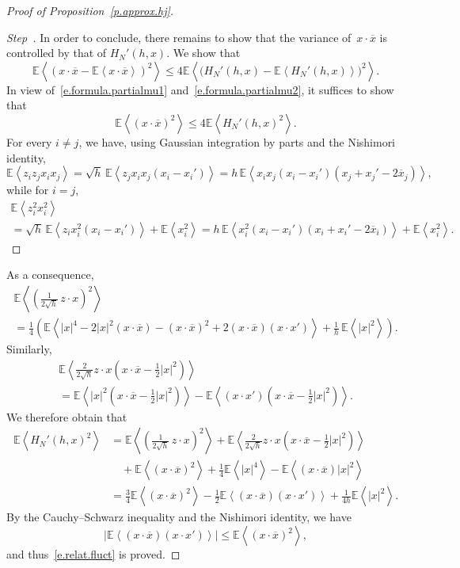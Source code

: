 \documentclass[10pt]{amsart}
\theoremstyle{definition}\newtheorem{defi}[theo]{Definition}\newtheorem{rema}[theo]{Remark}\newtheorem{exam}[theo]{Example}\newtheorem{exem}[theo]{Example}\newtheorem{nota}[theo]{Notation}
\newcommand{\E}{\mathbb{E}}
\newcommand{\1}{\mathds{1}}
\renewcommand{\le}{\leqslant}
\newcommand{\la}{\left\langle}
\newcommand{\ra}{\right\rangle}
\renewcommand{\bar}{\overline}
\newcounter{stepcount}
\newenvironment{step}{\refstepcounter{stepcount}\begin{proof}[Step~\thestepcount]}{\let\qed\relax\end{proof}}
\begin{document}
\begin{proof}[Proof of Proposition~\ref{p.approx.hj}]

\begin{step}\label{st3}
In order to conclude, there remains to show that the variance of~$x \cdot \bar x$ is controlled by that of $H_N'(h,x)$. We show that
\begin{equation}\label{e.relat.fluct}
\E \la \left(x\cdot \bar x - \E\la x\cdot \bar x \ra \right)^2 \ra \le 4 \E \la \big(H_N'(h,x) - \E \la H_N'(h,x) \ra \big) ^2 \ra.
\end{equation}
In view of~\eqref{e.formula.partialmu1} and~\eqref{e.formula.partialmu2}, it suffices to show that
\[
\E \la \left(x\cdot \bar x \right)^2 \ra \le 4 \E \la H_N'(h,x) ^2 \ra.
\]
For every $i \neq j$, we have, using Gaussian integration by parts and the Nishimori identity,
\[
\E \la z_i z_j x_i x_j \ra = \sqrt{h} \, \E \la z_j x_i x_j(x_i - x_i')\ra = h \, \E \la x_i x_j\left(x_i - x_i'\right)\left(x_j + x_j' -2 \bar x_j\right) \ra,
\]
while for $i = j$,
\begin{multline*}
\E \la z_i^2 x_i^2\ra\\
= \sqrt{h} \, \E \la z_i x_i^2(x_i - x_i') \ra + \E\la x_i^2 \ra = h \, \E \la x_i^2(x_i - x_i') (x_i + x_i' - 2 \bar x_i) \ra + \E \la x_i^2 \ra.
\end{multline*}
\end{step}
As a consequence,
\begin{multline*}
\E \la \left(\frac 1 {2\sqrt{h}} \, z \cdot x \right) ^2 \ra
\\
= \frac 1 4 \left(\E \la |x|^4 - 2 |x|^2(x\cdot \bar x) - (x\cdot \bar x)^2 + 2 (x\cdot \bar x)(x \cdot x')\ra+ \frac{1}{{h}} \, \E \la |x|^2 \ra\right).
\end{multline*}
Similarly,
\begin{multline*}
\E \la \frac{2}{2\sqrt{h}} z\cdot x \left(x \cdot \bar x - \frac 1 2 |x|^2 \right) \ra
\\
= \E \la |x|^2 \left(x \cdot \bar x - \frac 1 2 |x|^2 \right) \ra - \E \la (x\cdot x') \left(x \cdot \bar x - \frac 1 2 |x|^2 \right) \ra.
\end{multline*}
We therefore obtain that
\begin{align*}
\E \la H_N'(h,x)^2 \ra &=
\E \la \left(\frac 1 {2\sqrt{h}} \, z \cdot x \right) ^2 \ra +
\E \la \frac{2}{2\sqrt{h}} z\cdot x \left(x \cdot \bar x - \frac 1 2 |x|^2 \right) \ra
\\
&\quad +\E \la (x \cdot \bar x)^2 \ra + \frac 1 4 \E \la |x|^4 \ra - \E \la (x\cdot \bar x)|x|^2 \ra
\\
 &= \frac 3 4 \E \la (x\cdot \bar x)^2 \ra - \frac 1 2 \E \la (x \cdot \bar x)(x \cdot x') \ra + \frac 1 {4{h}} \E \la |x|^2 \ra.
\end{align*}
By the Cauchy--Schwarz inequality and the Nishimori identity, we have
\[
\left| \E \la (x \cdot \bar x)(x \cdot x') \ra \right| \le \E \la (x\cdot \bar x)^2 \ra,
\]
and thus~\eqref{e.relat.fluct} is proved.
\end{proof}
\end{document}
